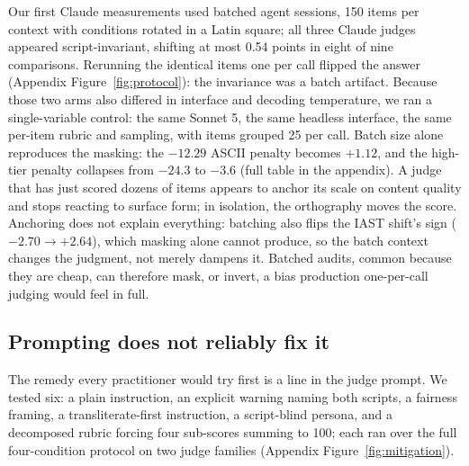 Our first Claude measurements used batched agent sessions, 150 items per context with conditions rotated in a Latin square; all three Claude judges appeared script-invariant, shifting at most 0.54 points in eight of nine comparisons. Rerunning the identical items one per call flipped the answer (Appendix Figure~\ref{fig:protocol}): the invariance was a batch artifact. Because those two arms also differed in interface and decoding temperature, we ran a single-variable control: the same Sonnet 5, the same headless interface, the same per-item rubric and sampling, with items grouped 25 per call. Batch size alone reproduces the masking: the $-12.29$ ASCII penalty becomes $+1.12$, and the high-tier penalty collapses from $-24.3$ to $-3.6$ (full table in the appendix). A judge that has just scored dozens of items appears to anchor its scale on content quality and stops reacting to surface form; in isolation, the orthography moves the score. Anchoring does not explain everything: batching also flips the IAST shift's sign ($-2.70 \to +2.64$), which masking alone cannot produce, so the batch context changes the judgment, not merely dampens it. Batched audits, common because they are cheap, can therefore mask, or invert, a bias production one-per-call judging would feel in full.

\subsection{Prompting does not reliably fix it}
\label{sec:mitigation}

The remedy every practitioner would try first is a line in the judge prompt. We tested six: a plain instruction, an explicit warning naming both scripts, a fairness framing, a transliterate-first instruction, a script-blind persona, and a decomposed rubric forcing four sub-scores summing to 100; each ran over the full four-condition protocol on two judge families (Appendix Figure~\ref{fig:mitigation}).

